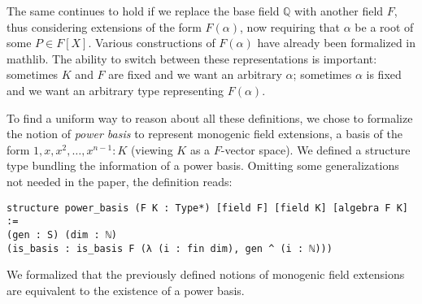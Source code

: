 \documentclass[a4paper,USenglish,cleveref, autoref, thm-restate]{lipics-v2021}
\newcommand{\mathlib}{\textsf{mathlib}\xspace}
\newcommand{\Q}{\mathbb{Q}}
\begin{document}
The same continues to hold if we replace the base field $\Q$ with another field $F$, thus considering extensions of the form $F(\alpha)$, now requiring that $\alpha$ be a root of some $P\in F[X]$. Various constructions of $F(\alpha)$ have already been formalized in \mathlib. The ability to switch between these representations is important: sometimes $K$ and $F$ are fixed and we want an arbitrary $\alpha$; sometimes $\alpha$ is fixed and we want an arbitrary type representing $F(\alpha)$.

To find a uniform way to reason about all these definitions,
we chose to formalize the notion of \emph{power basis} to represent monogenic field extensions, a basis of the form $1, x, x^2, \dots, x^{n-1} : K$ (viewing $K$ as a $F$-vector space).
We defined a structure type bundling the information of a power basis.
Omitting some generalizations not needed in the paper, the definition reads:
\begin{lstlisting}
structure power_basis (F K : Type*) [field F] [field K] [algebra F K] :=
(gen : S) (dim : ℕ)
(is_basis : is_basis F (λ (i : fin dim), gen ^ (i : ℕ)))
\end{lstlisting}
We formalized that the previously defined notions of monogenic field extensions are equivalent to the existence of a power basis.

\end{document}
